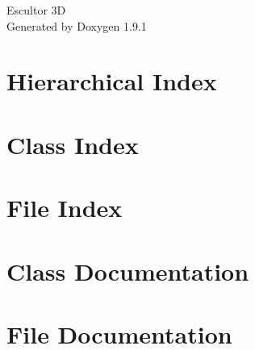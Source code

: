 \let\mypdfximage\pdfximage\def\pdfximage{\immediate\mypdfximage}\documentclass[twoside]{book}
\newcommand{\+}{\discretionary{\mbox{\scriptsize$\hookleftarrow$}}{}{}}
\newcommand{\clearemptydoublepage}{%
  \newpage{\pagestyle{empty}\cleardoublepage}%
}
\begin{document}
\raggedbottom

\hypersetup{pageanchor=false,
             bookmarksnumbered=true,
             pdfencoding=unicode
            }
\begin{titlepage}
\vspace*{7cm}
\begin{center}%
{\Large Escultor 3D }\\
\vspace*{1cm}
{\large Generated by Doxygen 1.9.1}\\
\end{center}
\end{titlepage}
\clearemptydoublepage
{}
\tableofcontents
\clearemptydoublepage
{}
\hypersetup{pageanchor=true}

\chapter{Hierarchical Index}

\chapter{Class Index}

\chapter{File Index}

\chapter{Class Documentation}












\chapter{File Documentation}

























\backmatter
\newpage
{}
\clearemptydoublepage
{}
\printindex
\end{document}
